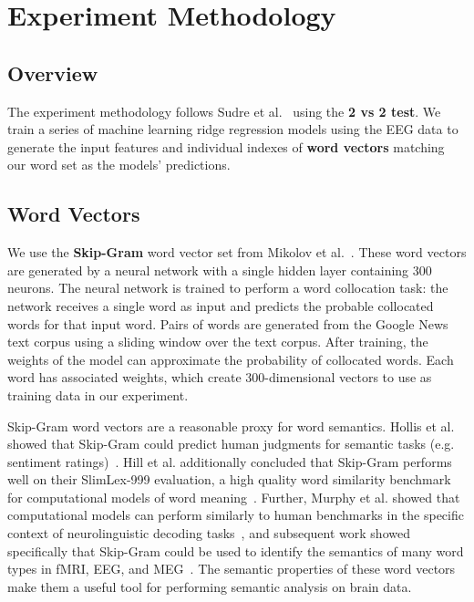 \section{Experiment Methodology}
\label{sec:methodology}

\subsection{Overview}
The experiment methodology follows Sudre et al.~\cite{Sudre2012} using the {\bf 2 vs 2 test}. We train a series of machine learning ridge regression models using the EEG data to generate the input features and individual indexes of {\bf word vectors} matching our word set as the models' predictions.

\subsection{Word Vectors}
We use the {\bf Skip-Gram} word vector set from Mikolov et al.~\cite{Mikolov2013}. These word vectors are generated by a neural network with a single hidden layer containing 300 neurons. The neural network is trained to perform a word collocation task: the network receives a single word as input and predicts the probable collocated words for that input word. Pairs of words are generated from the Google News text corpus using a sliding window over the text corpus. After training, the weights of the model can approximate the probability of collocated words. Each word has associated weights, which create 300-dimensional vectors to use as training data in our experiment.

 Skip-Gram word vectors are a reasonable proxy for word semantics. Hollis et al. showed that Skip-Gram could predict human judgments for semantic tasks (e.g. sentiment ratings)~\cite{hollis2017extrapolating}. Hill et al. additionally concluded that Skip-Gram performs well on their SlimLex-999 evaluation, a high quality word similarity benchmark for computational models of word meaning~\cite{hill2016simlex}. Further, Murphy et al. showed that computational models can perform similarly to human benchmarks in the specific context of neurolinguistic decoding tasks~\cite{Murphy2012}, and subsequent work showed specifically that Skip-Gram could be used to identify the semantics of many word types in fMRI, EEG, and MEG~\cite{xu2016brainbench}. The semantic properties of these word vectors make them a useful tool for performing semantic analysis on brain data.

